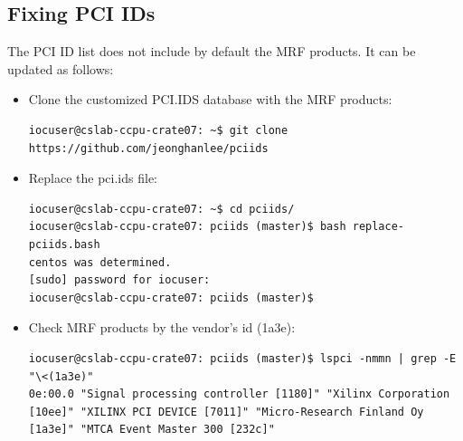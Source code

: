 \documentclass[11pt
  , a4paper
  , article
  , oneside
  , showtrims
]{memoir}
\begin{document}
\subsection{Fixing PCI IDs}
The PCI ID list does not include by default the MRF products. It can be updated as follows:
\begin{itemize}
\item Clone the customized PCI.IDS database with the MRF products:
\begin{lstlisting}[style=termstyle]
iocuser@cslab-ccpu-crate07: ~$ git clone https://github.com/jeonghanlee/pciids
\end{lstlisting}
\item Replace the pci.ids file:
\begin{lstlisting}[style=termstyle]
iocuser@cslab-ccpu-crate07: ~$ cd pciids/
iocuser@cslab-ccpu-crate07: pciids (master)$ bash replace-pciids.bash
centos was determined.
[sudo] password for iocuser:
iocuser@cslab-ccpu-crate07: pciids (master)$
\end{lstlisting}
\item Check MRF products by the vendor's id (1a3e):
\begin{lstlisting}[style=termstyle]
iocuser@cslab-ccpu-crate07: pciids (master)$ lspci -nmmn | grep -E "\<(1a3e)"
0e:00.0 "Signal processing controller [1180]" "Xilinx Corporation [10ee]" "XILINX PCI DEVICE [7011]" "Micro-Research Finland Oy [1a3e]" "MTCA Event Master 300 [232c]"
\end{lstlisting}
\end{itemize}
\end{document}
